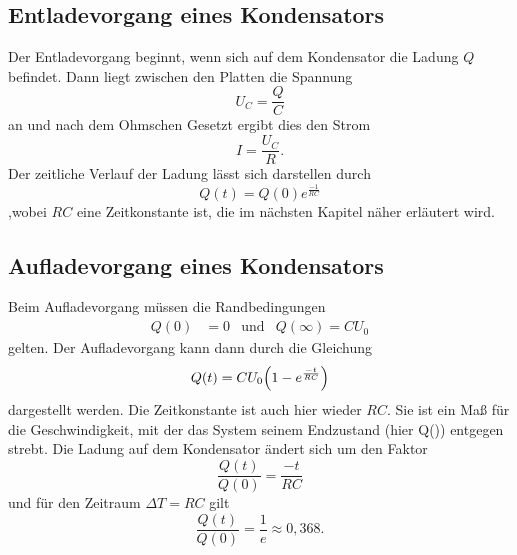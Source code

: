 \subsection{Entladevorgang eines Kondensators} %
\label{sub:Entladevorgang}
Der Entladevorgang beginnt, wenn sich auf dem Kondensator die Ladung $Q$ befindet.
Dann liegt zwischen den Platten die Spannung
\begin{equation}
    U_C = \frac{Q}{C}
    \label{eqn:Kondensatorspannung}
\end{equation}
an und nach dem Ohmschen Gesetzt ergibt dies den Strom
\begin{equation}
    I = \frac{U_C}{R} .
\end{equation}
Der zeitliche Verlauf der Ladung lässt sich darstellen durch
\begin{equation}
    Q(t) = Q(0) e^{\frac{-1}{RC}}
    \label{eqn:Ladung_zeitlich}
\end{equation}
,wobei $RC$ eine Zeitkonstante ist, die im nächsten Kapitel näher erläutert wird.


\subsection{Aufladevorgang eines Kondensators} %
\label{sub:Aufladevorgang}
Beim Aufladevorgang müssen die Randbedingungen
\begin{align}
    Q(0)&=0 &\text{und}& Q(\infty)=CU_0
\end{align}
gelten. Der Aufladevorgang kann dann durch die Gleichung
\begin{equation}
    Q(t)= CU_0\Bigl(1-e^{\frac{-t}{RC}}\Bigr)
\end{equation}
dargestellt werden. Die Zeitkonstante ist auch hier wieder $RC$.
Sie ist ein Maß für die Geschwindigkeit, mit der das System seinem Endzustand (hier Q(\infty)) entgegen strebt.
Die Ladung auf dem Kondensator ändert sich um den Faktor
\begin{equation}
    \frac{Q(t)}{Q(0)} = \frac{-t}{RC}
\end{equation}
und für den Zeitraum $\Delta T = RC$ gilt
\begin{equation}
    \frac{Q(t)}{Q(0)} = \frac{1}{e} \approx 0,368 .
\end{equation}



